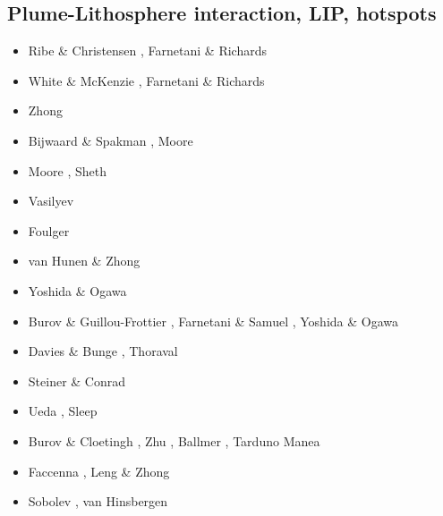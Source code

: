 \subsection{Plume-Lithosphere interaction, LIP, hotspots}

\begin{scriptsize}
\begin{itemize}
\item[\nineteenninetyfour] Ribe \& Christensen \cite{rich94}, Farnetani \& Richards \cite{fari94}
\item[\nineteenninetyfive] White \& McKenzie \cite{whmc95}, Farnetani \& Richards \cite{fari95}
\item[\nineteenninetysix] Zhong \etal \cite{zhgm96}
\item[\nineteenninetyeight] Bijwaard \& Spakman \cite{bisp98}, Moore \etal \cite{most98}
\item[\nineteenninetynine] Moore \etal \cite{most99}, Sheth \cite{shet99}
\item[\twothousandone] Vasilyev \etal \cite{vapy01}
\item[\twothousandtwo] Foulger \cite{foul02}
\item[\twothousandthree] van Hunen \& Zhong \cite{vazh03}
\item[\twothousandfour] Yoshida \& Ogawa \cite{yoog04}
\item[\twothousandfive] Burov \& Guillou-Frottier \cite{bugu05}, Farnetani \& Samuel \cite{fasa05}, 
                        Yoshida \& Ogawa \cite{yoog05}
\item[\twothousandsix] Davies \& Bunge \cite{dabu06}, Thoraval \etal \cite{thtd06}
\item[\twothousandseven] Steiner \& Conrad \cite{stco07}
\item[\twothousandeight] Ueda \etal \cite{uegs08}, Sleep \cite{slee08}
\item[\twothousandnine] Burov \& Cloetingh \cite{bucl09}, Zhu \etal \cite{zhgy09},
                        Ballmer \etal \cite{baiv10}, Tarduno \etal \cite{tabs09}
                        Manea \etal \cite{maml09}
\item[\twothousandten] Faccenna \etal \cite{fabl10}, Leng \& Zhong \cite{lezh10}
\item[\twothousandeleven] Sobolev \etal \cite{sosk11}, van Hinsbergen \etal \cite{vasd11}

\end{itemize}
\end{scriptsize}
